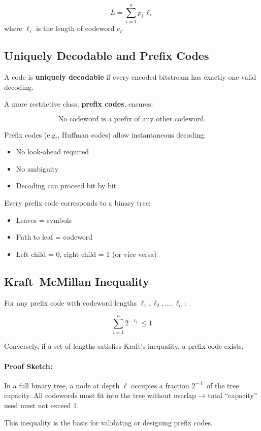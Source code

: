 \documentclass{AnantDocumentation}
\begin{document}
\[
L = \sum_{i=1}^{n} p_i \, \ell_i
\]
where \( \ell_i \) is the length of codeword \(c_i\).

\subsection{Uniquely Decodable and Prefix Codes}

A code is \textbf{uniquely decodable} if every encoded bitstream has exactly one valid decoding.

A more restrictive class, \textbf{prefix codes}, ensures:

\[
\text{No codeword is a prefix of any other codeword.}
\]

Prefix codes (e.g., Huffman codes) allow instantaneous decoding:
\begin{itemize}
\item No look-ahead required
\item No ambiguity
\item Decoding can proceed bit by bit
\end{itemize}

Every prefix code corresponds to a binary tree:
\begin{itemize}
\item Leaves = symbols
\item Path to leaf = codeword
\item Left child = 0, right child = 1 (or vice versa)
\end{itemize}

\subsection{Kraft–McMillan Inequality}

For any prefix code with codeword lengths \(\ell_1, \ell_2, \ldots, \ell_n\):

\[
\boxed{\sum_{i=1}^{n} 2^{-\ell_i} \le 1}
\]

Conversely, if a set of lengths satisfies Kraft’s inequality, a prefix code exists.

\paragraph{Proof Sketch:}
In a full binary tree, a node at depth \(\ell\) occupies a fraction \(2^{-\ell}\) of the tree capacity.  
All codewords must fit into the tree without overlap → total “capacity” used must not exceed 1.

This inequality is the basis for validating or designing prefix codes.
\end{document}
